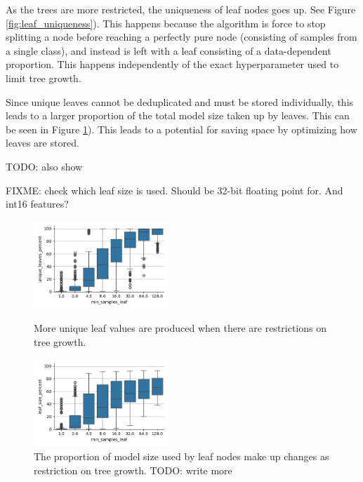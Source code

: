 \documentclass{article}
\begin{document}
As the trees are more restricted, the uniqueness of leaf nodes goes up. 
See Figure \ref{fig:leaf_uniqueness}).
This happens because the algorithm is force to stop splitting a node before reaching a perfectly pure node (consisting of samples from a single class), and instead is left with a leaf consisting of a data-dependent proportion.
This happens independently of the exact hyperparameter used to limit tree growth.


Since unique leaves cannot be deduplicated and must be stored individually, this leads to a larger proportion of the total model size taken up by leaves.
This can be seen in Figure \ref{fig:leaf_proportions}).
This leads to a potential for saving space by optimizing how leaves are stored. 

TODO: also show   

FIXME: check which leaf size is used. Should be 32-bit floating point for.
And int16 features?

\begin{figure}
\centering
\begin{minipage}{.5\textwidth}
  \includegraphics[width=2in]{reports/figures/leaf-uniqueness.png}
  \caption{ More unique leaf values are produced when there are restrictions on tree growth. }
  \label{fig:leaf_uniqueness}
\end{minipage}%
\begin{minipage}{.5\textwidth}
  \centering
  \includegraphics[width=2in]{reports/figures/leaf-proportion.png}
  \caption{The proportion of model size used by leaf nodes make up changes as restriction on tree growth. TODO: write more }
  \label{fig:leaf_proportions}
\end{minipage}
\end{figure}
\end{document}
